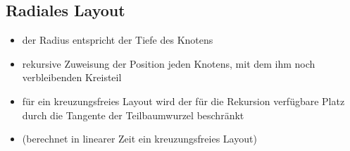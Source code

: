 \subsection{Radiales Layout}
\begin{minipage}{0.4\textwidth}
	
\end{minipage}\hfill
\begin{minipage}{0.6\textwidth}
	\begin{itemize}[itemsep=-1pt]
		\item der Radius entspricht der Tiefe des Knotens
		\item rekursive Zuweisung der Position jeden Knotens, mit dem ihm noch verbleibenden Kreisteil
		\item für ein kreuzungsfreies Layout wird der für die Rekursion verfügbare Platz durch die Tangente der Teilbaumwurzel beschränkt
		\item {} (berechnet in linearer Zeit ein kreuzungsfreies Layout)
	\end{itemize}
	\centering{}
\end{minipage}
